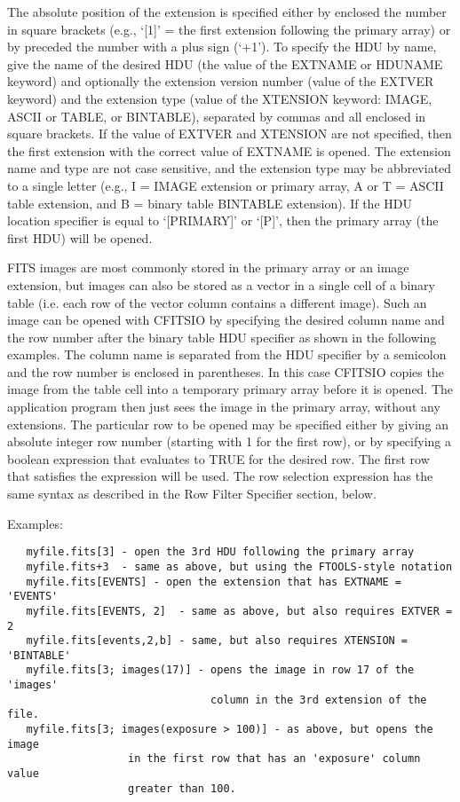 \documentclass[11pt]{book}
\begin{document}
The absolute position of the extension is specified either by enclosed
the number in square brackets (e.g., `[1]' = the first extension
following the primary array) or by preceded the number with a plus sign
(`+1').  To specify the HDU by name, give the name of the desired HDU
(the value of the EXTNAME or HDUNAME keyword) and optionally the
extension version number (value of the EXTVER keyword) and the
extension type (value of the XTENSION keyword: IMAGE, ASCII or TABLE,
or BINTABLE), separated by commas and all enclosed in square brackets.
If the value of EXTVER and XTENSION are not specified, then the first
extension with the correct value of EXTNAME is opened. The extension
name and type are not case sensitive, and the extension type may be
abbreviated to a single letter (e.g., I = IMAGE extension or primary
array, A or T = ASCII table extension, and B = binary table BINTABLE
extension).   If the HDU location specifier is equal to `[PRIMARY]' or
`[P]', then the primary array (the first HDU) will be opened.

FITS images are most commonly stored in the primary array or an image
extension, but images can also be stored as a vector in a single cell
of a binary table (i.e. each row of the vector column contains a
different image).  Such an image can be opened with CFITSIO by
specifying the desired column  name and the row number after the binary
table HDU specifier as shown in the following examples. The column name
is separated from the HDU specifier by a semicolon and the row number
is enclosed in parentheses.  In this case CFITSIO copies the image from
the table cell into a temporary primary array before it is opened.  The
application program then just sees the image in the primary array,
without any extensions.  The particular row to be opened may be
specified either by giving an absolute integer row number (starting
with 1 for the first row), or by specifying a boolean expression that
evaluates to TRUE for the desired row.  The first row that satisfies
the expression will be used.  The row selection expression has the same
syntax as described in the Row Filter Specifier section, below.

 Examples:

\begin{verbatim}
   myfile.fits[3] - open the 3rd HDU following the primary array
   myfile.fits+3  - same as above, but using the FTOOLS-style notation
   myfile.fits[EVENTS] - open the extension that has EXTNAME = 'EVENTS'
   myfile.fits[EVENTS, 2]  - same as above, but also requires EXTVER = 2
   myfile.fits[events,2,b] - same, but also requires XTENSION = 'BINTABLE'
   myfile.fits[3; images(17)] - opens the image in row 17 of the 'images'
                                column in the 3rd extension of the file.
   myfile.fits[3; images(exposure > 100)] - as above, but opens the image
                   in the first row that has an 'exposure' column value
                   greater than 100.
\end{verbatim}
\end{document}
